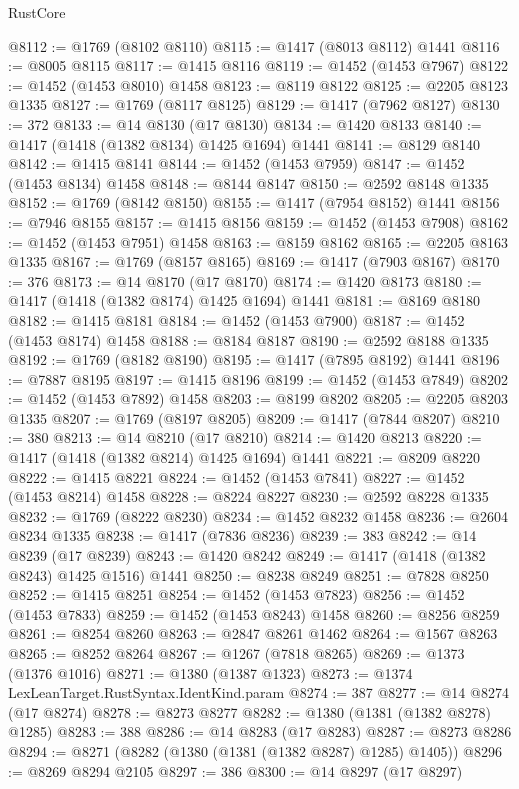 \begin{lexlean}{RustCore}
\begin{coremodule}
@8112 := @1769 (@8102 @8110)
@8115 := @1417 (@8013 @8112) @1441
@8116 := @8005 @8115
@8117 := @1415 @8116
@8119 := @1452 (@1453 @7967)
@8122 := @1452 (@1453 @8010) @1458
@8123 := @8119 @8122
@8125 := @2205 @8123 @1335
@8127 := @1769 (@8117 @8125)
@8129 := @1417 (@7962 @8127)
@8130 := 372
@8133 := @14 @8130 (@17 @8130)
@8134 := @1420 @8133
@8140 := @1417 (@1418 (@1382 @8134) @1425 @1694) @1441
@8141 := @8129 @8140
@8142 := @1415 @8141
@8144 := @1452 (@1453 @7959)
@8147 := @1452 (@1453 @8134) @1458
@8148 := @8144 @8147
@8150 := @2592 @8148 @1335
@8152 := @1769 (@8142 @8150)
@8155 := @1417 (@7954 @8152) @1441
@8156 := @7946 @8155
@8157 := @1415 @8156
@8159 := @1452 (@1453 @7908)
@8162 := @1452 (@1453 @7951) @1458
@8163 := @8159 @8162
@8165 := @2205 @8163 @1335
@8167 := @1769 (@8157 @8165)
@8169 := @1417 (@7903 @8167)
@8170 := 376
@8173 := @14 @8170 (@17 @8170)
@8174 := @1420 @8173
@8180 := @1417 (@1418 (@1382 @8174) @1425 @1694) @1441
@8181 := @8169 @8180
@8182 := @1415 @8181
@8184 := @1452 (@1453 @7900)
@8187 := @1452 (@1453 @8174) @1458
@8188 := @8184 @8187
@8190 := @2592 @8188 @1335
@8192 := @1769 (@8182 @8190)
@8195 := @1417 (@7895 @8192) @1441
@8196 := @7887 @8195
@8197 := @1415 @8196
@8199 := @1452 (@1453 @7849)
@8202 := @1452 (@1453 @7892) @1458
@8203 := @8199 @8202
@8205 := @2205 @8203 @1335
@8207 := @1769 (@8197 @8205)
@8209 := @1417 (@7844 @8207)
@8210 := 380
@8213 := @14 @8210 (@17 @8210)
@8214 := @1420 @8213
@8220 := @1417 (@1418 (@1382 @8214) @1425 @1694) @1441
@8221 := @8209 @8220
@8222 := @1415 @8221
@8224 := @1452 (@1453 @7841)
@8227 := @1452 (@1453 @8214) @1458
@8228 := @8224 @8227
@8230 := @2592 @8228 @1335
@8232 := @1769 (@8222 @8230)
@8234 := @1452 @8232 @1458
@8236 := @2604 @8234 @1335
@8238 := @1417 (@7836 @8236)
@8239 := 383
@8242 := @14 @8239 (@17 @8239)
@8243 := @1420 @8242
@8249 := @1417 (@1418 (@1382 @8243) @1425 @1516) @1441
@8250 := @8238 @8249
@8251 := @7828 @8250
@8252 := @1415 @8251
@8254 := @1452 (@1453 @7823)
@8256 := @1452 (@1453 @7833)
@8259 := @1452 (@1453 @8243) @1458
@8260 := @8256 @8259
@8261 := @8254 @8260
@8263 := @2847 @8261 @1462
@8264 := @1567 @8263
@8265 := @8252 @8264
@8267 := @1267 (@7818 @8265)
@8269 := @1373 (@1376 @1016)
@8271 := @1380 (@1387 @1323)
@8273 := @1374 LexLeanTarget.RustSyntax.IdentKind.param
@8274 := 387
@8277 := @14 @8274 (@17 @8274)
@8278 := @8273 @8277
@8282 := @1380 (@1381 (@1382 @8278) @1285)
@8283 := 388
@8286 := @14 @8283 (@17 @8283)
@8287 := @8273 @8286
@8294 := @8271 (@8282 (@1380 (@1381 (@1382 @8287) @1285) @1405))
@8296 := @8269 @8294 @2105
@8297 := 386
@8300 := @14 @8297 (@17 @8297)

\end{coremodule}
\end{lexlean}
